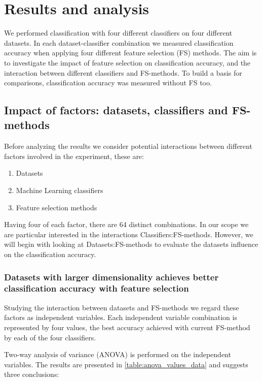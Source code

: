 \chapter{Results and analysis}

We performed classification with four different classifiers on four different datasets. In each dataset-classifier combination we measured classification accuracy when applying four different feature selection (FS) methods. The aim is to investigate the impact of feature selection on classification accuracy, and the interaction between different classifiers and FS-methods. To build a basis for comparisons, classification accuracy was measured without FS too.

\section{Impact of factors: datasets, classifiers and FS-methods}
\label{Variation_among_factors}

Before analyzing the results we consider potential interactions between different factors involved in the experiment, these are:

\begin{enumerate}
  \item Datasets
  \item Machine Learning classifiers
  \item Feature selection methods
\end{enumerate}

Having four of each factor, there are 64 distinct combinations. In our scope we are particular interested in the interactions Classifiers:FS-methods. However, we will begin with looking at Datasets:FS-methods to evaluate the datasets influence on the classification accuracy.

\subsection{Datasets with larger dimensionality achieves better classification accuracy with feature selection}

Studying the interaction between datasets and FS-methods we regard these factors as independent variables. Each independent variable combination is represented by four values, the best accuracy achieved with current FS-method by each of the four classifiers.

Two-way analysis of variance (ANOVA) is performed on the independent variables. The results are presented in \ref{table:anova_values_data} and suggests three conclusions:

